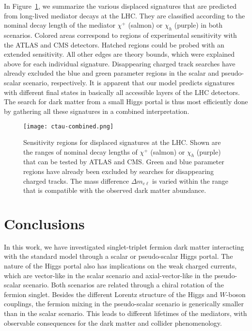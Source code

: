 \documentclass[nofootinbib,prd,aps,superscriptaddress,preprintnumbers]{revtex4}
\begin{document}
In Figure~\ref{fig:ctau}, we summarize the various displaced signatures that are predicted from long-lived mediator decays at the LHC. They are classified according to the nominal decay length of the mediator $\chi^+$ (salmon) or $\chi_h$ (purple) in both scenarios. Colored areas correspond to regions of experimental sensitivity with the ATLAS and CMS detectors. Hatched regions could be probed with an extended sensitivity. All other edges are theory bounds, which were explained above for each individual signature. Disappearing charged track searches have already excluded the blue and green parameter regions in the scalar and pseudo-scalar scenario, respectively. It is apparent that our model predicts signatures with different final states in basically all accessible layers of the LHC detectors. The search for dark matter from a small Higgs portal is thus most efficiently done by gathering all these signatures in a combined interpretation.
\begin{figure}[!t]
\centering
\texttt{[image: ctau-combined.png]}
\caption{\label{fig:ctau}Sensitivity regions for displaced signatures at the LHC. Shown are the ranges of nominal decay lengths of $\chi^+$ (salmon) or $\chi_h$ (purple) that can be tested by ATLAS and CMS. Green and blue parameter regions have already been excluded by searches for disappearing charged tracks. The mass difference $\Delta m_{c\ell}$ is varied within the range that is compatible with the observed dark matter abundance.}
\end{figure}


\section{Conclusions}\label{sec:conclusions}
%
\noindent
In this work, we have investigated singlet-triplet fermion dark matter interacting with the standard model through a scalar or pseudo-scalar Higgs portal. The nature of the Higgs portal also has implications on the weak charged currents, which are vector-like in the scalar scenario and axial-vector-like in the pseudo-scalar scenario. Both scenarios are related through a chiral rotation of the fermion singlet. Besides the different Lorentz structure of the Higgs and $W$-boson couplings, the fermion mixing in the pseudo-scalar scenario is generically smaller than in the scalar scenario. This leads to different lifetimes of the mediators, with observable consequences for the dark matter and collider phenomenology.
\end{document}

